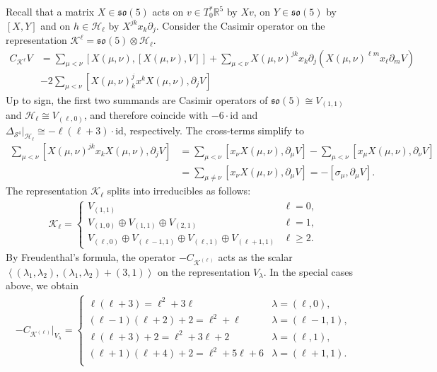 \documentclass[11pt,reqno]{amsart}
\theoremstyle{remark}
\theoremstyle{definition}
\newcommand{\sov}{\mathfrak{so}(5)}
\begin{document}
Recall that a matrix $X \in \sov$ acts on $v \in T^\ast_0 \mathbb R^5$ by $X v$, on $Y \in \sov$ by $[X,Y]$ and on $h \in \mathcal H_\ell$ by $X^{jk} x_k \partial_j$.
Consider the Casimir operator on the representation $\mathcal K^\ell = \sov \otimes \mathcal H_\ell$.
\begin{align*}
    C_{\mathcal K^\ell}V &= \sum_{\mu<\nu} [X(\mu,\nu),[X(\mu,\nu),V]] + \sum_{\mu < \nu} X(\mu,\nu)^{jk} x_k \partial_j( X(\mu,\nu)^{\ell m} x_{\ell} \partial_m V) \\ &- 2 \sum_{\mu<\nu} [X(\mu,\nu)^{j}_k x^k X(\mu,\nu), \partial_j V] 
\end{align*}
Up to sign, the first two summands are Casimir operators of $\sov \cong V_{(1,1)}$ and $\mathcal H_\ell \cong V_{(\ell,0)}$, and therefore coincide with $- 6 \cdot\mathrm{id}$ and $\Delta_{\mathcal S^{4}}|_{\mathcal H_\ell} \cong - \ell(\ell+3) \cdot \mathrm{id}$, respectively. The cross-terms simplify to 
\begin{align*}
    \sum_{\mu<\nu} [X(\mu,\nu)^{jk} x_k X(\mu,\nu), \partial_j V] &= \sum_{\mu<\nu} [x_\nu X(\mu,\nu), \partial_\mu V] - \sum_{\mu<\nu} [x_\mu X(\mu,\nu), \partial_\nu V] \\
    &= \sum_{\mu\neq \nu} [x_\nu X(\mu,\nu), \partial_\mu V] = -[\sigma_\mu,\partial_\mu V].
\end{align*}
The representation $\mathcal K_\ell$ splits into irreducibles as follows:
\begin{align*}
    \mathcal K_\ell = \begin{cases}
        V_{(1,1)} & \ell = 0, \\
        V_{(1,0)} \oplus V_{(1,1)} \oplus V_{(2,1)} & \ell = 1, \\
        V_{(\ell,0)} \oplus V_{(\ell-1,1)} \oplus V_{(\ell,1)} \oplus V_{(\ell+1,1)} & \ell \geq 2.
    \end{cases}
\end{align*}
By Freudenthal's formula, the operator $- C_{\mathcal K^{(\ell)}}$ acts as the scalar $\left\langle (\lambda_1,\lambda_2) , (\lambda_1,\lambda_2) + (3,1) \right\rangle$ on the representation $V_{\lambda}$. In the special cases above, we obtain
\begin{align*}
    - C_{\mathcal K^{(\ell)}}|_{V_{\lambda}} = \begin{cases}
        \ell(\ell+3)=\ell^2+3\ell & \lambda = (\ell,0), \\
        (\ell-1)(\ell+2)+2=\ell^2+\ell & \lambda = (\ell-1,1), \\
        \ell(\ell+3) + 2 = \ell^2 + 3\ell + 2& \lambda = (\ell,1), \\
        (\ell+1)(\ell+4) + 2 = \ell^2 + 5\ell + 6& \lambda = (\ell+1,1). \\
    \end{cases}
\end{align*}
\end{document}
